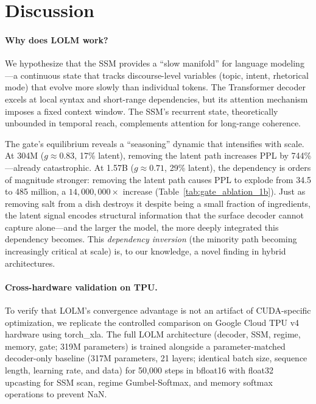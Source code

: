 \documentclass{article}
\begin{document}
\section{Discussion}
\label{sec:discussion}

\paragraph{Why does LOLM work?}
We hypothesize that the SSM provides a ``slow manifold'' for language
modeling---a continuous state that tracks discourse-level variables (topic,
intent, rhetorical mode) that evolve more slowly than individual tokens. The
Transformer decoder excels at local syntax and short-range dependencies, but
its attention mechanism imposes a fixed context window. The SSM's recurrent
state, theoretically unbounded in temporal reach, complements attention for
long-range coherence.

The gate's equilibrium reveals a ``seasoning'' dynamic that intensifies with
scale. At 304M ($g \approx 0.83$, 17\% latent), removing the latent path
increases PPL by 744\%---already catastrophic. At 1.57B ($g \approx 0.71$,
29\% latent), the dependency is orders of magnitude stronger: removing the
latent path causes PPL to explode from 34.5 to 485 million, a
$14{,}000{,}000\times$ increase (Table~\ref{tab:gate_ablation_1b}). Just as
removing salt from a dish destroys it despite being a small fraction of
ingredients, the latent signal encodes structural information that the
surface decoder cannot capture alone---and the larger the model, the more
deeply integrated this dependency becomes. This \emph{dependency inversion}
(the minority path becoming increasingly critical at scale) is, to our
knowledge, a novel finding in hybrid architectures.

\paragraph{Cross-hardware validation on TPU.}
To verify that LOLM's convergence advantage is not an artifact of CUDA-specific
optimization, we replicate the controlled comparison on Google Cloud TPU v4
hardware using torch\_xla. The full LOLM architecture (decoder, SSM, regime,
memory, gate; 319M parameters) is trained alongside a parameter-matched
decoder-only baseline (317M parameters, 21 layers; identical batch size,
sequence length, learning rate, and data) for 50{,}000 steps in bfloat16
with float32 upcasting for SSM scan, regime Gumbel-Softmax, and memory
softmax operations to prevent NaN.
\end{document}
